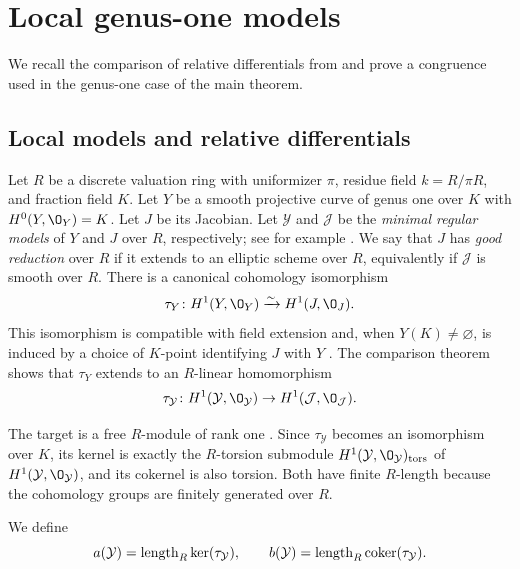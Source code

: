 \section{Local genus-one models}\label{sec:local-genus-one}
We recall the comparison of relative differentials from \cite{LLR04} and prove a congruence used in the genus-one case of the main theorem.

\subsection{Local models and relative differentials}\label{subsec:genus-one-setting}
Let $R$ be a discrete valuation ring with uniformizer $\pi$, residue field $k = R/\pi R$, and fraction field $K$.
Let $Y$ be a smooth projective curve of genus one over $K$ with $H^0(Y,\O_Y) = K$.
Let $J$ be its Jacobian.
Let $\mathcal Y$ and $\mathcal J$ be the {\em minimal regular models} of $Y$ and $J$ over $R$, respectively; see for example \cite[Section~9.3]{Liu02}.
We say that $J$ has \emph{good reduction} over $R$ if it extends to an elliptic scheme over $R$, equivalently if $\mathcal J$ is smooth over $R$.
There is a canonical cohomology isomorphism \cite[1.4]{LLR04}
\begin{equation}\label{eq:tau}
  \tau_Y\from H^1(Y,\O_Y)\xrightarrow{\sim}H^1(J,\O_J).
\end{equation}
This isomorphism is compatible with field extension and, when $Y(K)\neq\varnothing$, is induced by a choice of $K$-point identifying $J$ with $Y$ \cite[1.4 and Corollary~1.5]{LLR04}.
The comparison theorem \cite[Theorem~3.8]{LLR04} shows that $\tau_Y$ extends to an $R$-linear homomorphism
\[
  \tau_{\mathcal Y}\from H^1(\mathcal Y,\O_{\mathcal Y})\to H^1(\mathcal J,\O_{\mathcal J}).
\]

The target is a free $R$-module of rank one \cite[Corollary~5.8]{LLR04}.
Since $\tau_{\mathcal Y}$ becomes an isomorphism over $K$, its kernel is exactly the $R$-torsion submodule $H^1(\mathcal Y,\O_{\mathcal Y})_{\rm tors}$ of $H^1(\mathcal Y,\O_{\mathcal Y})$, and its cokernel is also torsion.
Both have finite $R$-length because the cohomology groups are finitely generated over $R$.

\begin{definition}\label{def:hodge}
We define
\[
  a(\mathcal Y) = \operatorname{length}_R\ker(\tau_{\mathcal Y}),\qquad b(\mathcal Y) = \operatorname{length}_R\operatorname{coker}(\tau_{\mathcal Y}).
\]
\end{definition}

